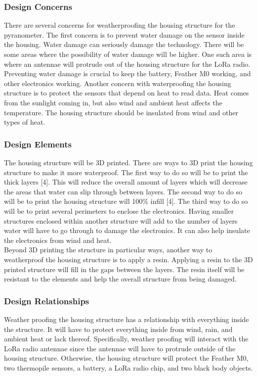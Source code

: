 \documentclass[10pt,draftclsnofoot,onecolumn,letterpaper]{article}
\begin{document}
\subsubsection{Design Concerns}
There are several concerns for weatherproofing the housing structure for the pyranometer. The first concern is to prevent water damage on the sensor inside the housing. Water damage can seriously damage the technology. There will be some areas where the possibility of water damage will be higher. One such area is where an antennae will protrude out of the housing structure for the LoRa radio. Preventing water damage is crucial to keep the battery, Feather M0 working, and other electronics working. Another concern with waterproofing the housing structure is to protect the sensors that depend on heat to read data. Heat comes from the sunlight coming in, but also wind and ambient heat affects the temperature. The housing structure should be insulated from wind and other types of heat. 

\subsubsection{Design Elements}
The housing structure will be 3D printed. There are ways to 3D print the housing structure to make it more waterproof. The first way to do so will be to print the thick layers [4]. This will reduce the overall amount of layers which will decrease the areas that water can slip through between layers. The second way to do so will be to print the housing structure will 100\% infill [4]. The third way to do so will be to print several perimeters to enclose the electronics. Having smaller structures enclosed within another structure will add to the number of layers water will have to go through to damage the electronics. It can also help insulate the electronics from wind and heat.\\
Beyond 3D printing the structure in particular ways, another way to weatherproof the housing structure is to apply a resin. Applying a resin to the 3D printed structure will fill in the gaps between the layers. The resin itself will be resistant to the elements and help the overall structure from being damaged. 

\subsubsection{Design Relationships}
Weather proofing the housing structure has a relationship with everything inside the structure. It will have to protect everything inside from wind, rain, and ambient heat or lack thereof. Specifically, weather proofing will interact with the LoRa radio antennae since the antennae will have to protrude outside of the housing structure. Otherwise, the housing structure will protect the Feather M0, two thermopile sensors, a battery, a LoRa radio chip, and two black body objects. 
\end{document}

